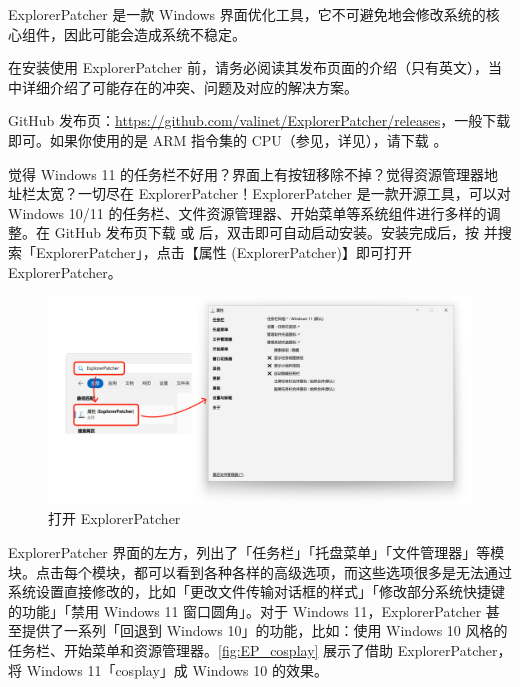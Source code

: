 \begin{danger}
  ExplorerPatcher 是一款 Windows 界面优化工具，它不可避免地会修改系统的核心组件，因此可能会造成系统不稳定。

  在安装使用 ExplorerPatcher 前，请务必阅读其发布页面的介绍（只有英文），当中详细介绍了可能存在的冲突、问题及对应的解决方案。
\end{danger}

GitHub 发布页：\url{https://github.com/valinet/ExplorerPatcher/releases}，一般下载  即可。如果你使用的是 ARM 指令集的 CPU（参见，详见），请下载 。

觉得 Windows 11 的任务栏不好用？界面上有按钮移除不掉？觉得资源管理器地址栏太宽？一切尽在 ExplorerPatcher！ExplorerPatcher 是一款开源工具，可以对 Windows 10/11 的任务栏、文件资源管理器、开始菜单等系统组件进行多样的调整。在 GitHub 发布页下载  或  后，双击即可自动启动安装。安装完成后，按  并搜索「ExplorerPatcher」，点击【属性 (ExplorerPatcher)】即可打开 ExplorerPatcher。

\begin{figure}[htb!]
  \centering
  \includegraphics[width=.75\textwidth]{assets/software/EP_open.png}
  \caption{打开 ExplorerPatcher}
  \label{fig:EP_open}
\end{figure}

ExplorerPatcher 界面的左方，列出了「任务栏」「托盘菜单」「文件管理器」等模块。点击每个模块，都可以看到各种各样的高级选项，而这些选项很多是无法通过系统设置直接修改的，比如「更改文件传输对话框的样式」「修改部分系统快捷键的功能」「禁用 Windows 11 窗口圆角」。对于 Windows 11，ExplorerPatcher 甚至提供了一系列「回退到 Windows 10」的功能，比如：使用 Windows 10 风格的任务栏、开始菜单和资源管理器。\autoref{fig:EP_cosplay} 展示了借助 ExplorerPatcher，将 Windows 11「cosplay」成 Windows 10 的效果。

